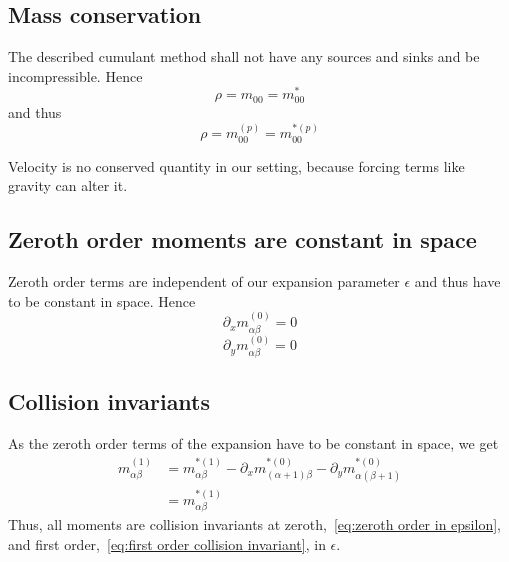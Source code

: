 \documentclass{article}
\begin{document}
\subsection{Mass conservation}
\label{sub:Mass conservation}
The described cumulant method shall not have any sources and sinks and be incompressible. Hence
\begin{equation}
    \rho  = m_{00} = m_{00}^*
\end{equation}
and thus
\begin{equation}
    \rho = m_{00}^{(p)} = m_{00}^{*(p)}
\end{equation}

Velocity is no conserved quantity in our setting, because forcing terms like gravity can alter it.

\subsection{Zeroth order moments are constant in space}
\label{sub:Zeroth order moments are constant in space}
Zeroth order terms are independent of our expansion parameter $\epsilon$ and thus have to be constant in space. Hence
\begin{equation}
  \partial_x m_{\alpha\beta}^{(0)} = 0
\end{equation}
\begin{equation}
  \partial_y m_{\alpha\beta}^{(0)} = 0
\end{equation}


\subsection{Collision invariants}
\label{sub:Collision invariants}
As the zeroth order terms of the expansion have to be constant in space, we get
\begin{equation}
  \label{eq:first order collision invariant}
  \begin{aligned}
    m_{\alpha\beta}^{(1)}
    & = m_{\alpha\beta}^{*(1)}
    - \partial_x m_{(\alpha+1)\beta}^{*(0)}
    - \partial_y m_{\alpha(\beta+1)}^{*(0)} \\
    & = m_{\alpha\beta}^{*(1)}
  \end{aligned}
\end{equation}
Thus, all moments are collision invariants at zeroth,~\eqref{eq:zeroth order in epsilon}, and first order,~\eqref{eq:first order collision invariant}, in $\epsilon$.
\end{document}
